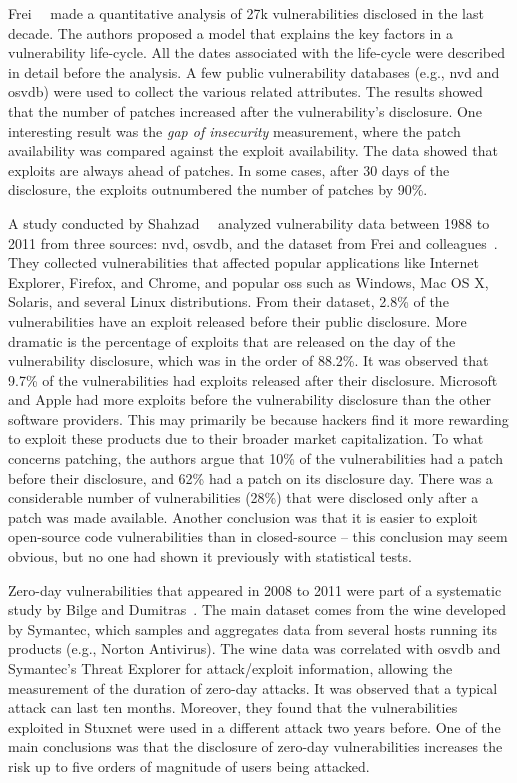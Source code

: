 Frei~\etal{}~\cite{Frei:2010} made a quantitative analysis of 27k vulnerabilities disclosed in the last decade.
The authors proposed a model that explains the key factors in a vulnerability life-cycle.
All the dates associated with the life-cycle were described in detail before the analysis.
A few public vulnerability databases (e.g., \gls{nvd} and \gls{osvdb}) were used to collect the various related attributes.
The results showed that the number of patches increased after the vulnerability's disclosure.  
One interesting result was the \emph{gap of insecurity} measurement, where the patch availability was compared against the exploit availability. 
The data showed that exploits are always ahead of patches.
In some cases, after 30 days of the disclosure, the exploits outnumbered the number of patches by 90\%.


A study conducted by Shahzad~\etal{}~\cite{Shahzad:2012} analyzed vulnerability data between 1988 to 2011 from three sources: \gls{nvd}, \gls{osvdb}, and the dataset from Frei and colleagues~\cite{Frei:2006}.
They collected vulnerabilities that affected popular applications like Internet Explorer, Firefox, and Chrome, and popular \glspl{os} such as Windows, Mac OS X, Solaris, and several Linux distributions. 
From their dataset, 2.8\% of the vulnerabilities have an exploit released before their public disclosure. 
More dramatic is the percentage of exploits that are released on the day of the vulnerability disclosure, which was in the order of 88.2\%. 
It was observed that 9.7\% of the vulnerabilities had exploits released after their disclosure.
Microsoft and Apple had more exploits before the vulnerability disclosure than the other software providers. 
This may primarily be because hackers find it more rewarding to exploit these products due to their broader market capitalization.
To what concerns patching, the authors argue that 10\% of the vulnerabilities had a patch before their disclosure,
 and 62\% had a patch on its disclosure day. 
There was a considerable number of vulnerabilities (28\%) that were disclosed only after a patch was made available. 
Another conclusion was that it is easier to exploit open-source code vulnerabilities than in closed-source – this conclusion may seem obvious, but no one had shown it previously with statistical tests.

Zero-day vulnerabilities that appeared in 2008 to 2011 were part of a systematic study by Bilge and Dumitras~\cite{Bilge:2012}.
The main dataset comes from the \gls{wine} developed by Symantec, which samples and aggregates data from several hosts running its products (e.g., Norton Antivirus).
The \gls{wine} data was correlated with \gls{osvdb} and Symantec's Threat Explorer for attack/exploit information, allowing the measurement of the duration of zero-day attacks.
It was observed that a typical attack can last ten months. 
Moreover, they found that the vulnerabilities exploited in Stuxnet were used in a different attack two years before.
One of the main conclusions was that the disclosure of zero-day vulnerabilities increases the risk up to five orders of magnitude of users being attacked.


